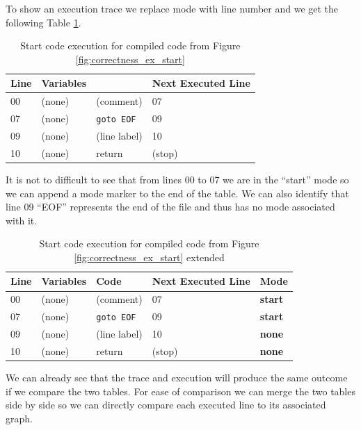 To show an execution trace we replace mode with line number and we get the following Table \ref{table:BasicExecOnly}.

\begin{table}[htcb]
	\caption{Start code execution for compiled code from Figure \ref{fig:correctness_ex_start}}
	\centering
		\begin{tabular}{| l | l | l | l |}
			\hline
			\textbf{Line} & \textbf{Variables} & \text{Code} & \textbf{Next Executed Line} \\
			\hline
			00 & (none) & (comment) & 07 \\
			\hline
			07 & (none) & \texttt{goto EOF} & 09 \\
			\hline
			09 & (none) & (line label) & 10 \\
			\hline
			10 & (none) & return & (stop) \\
			\hline
		\end{tabular}
	\label{table:BasicExecOnly}
\end{table}

It is not to difficult to see that from lines 00 to 07 we are in the ``start'' mode so we can append a
mode marker to the end of the table. We can also identify that line 09 ``EOF'' represents the end of the
file and thus has no mode associated with it.

\begin{table}[htcb]
	\caption{Start code execution for compiled code from Figure \ref{fig:correctness_ex_start} extended}
	\centering
		\begin{tabular}{| l | l | l | l | l |}
			\hline
			\textbf{Line} & \textbf{Variables} & \textbf{Code} & \textbf{Next Executed Line} & \textbf{Mode}\\
			\hline
			00 & (none) & (comment) & 07 & \textbf{start} \\
			\hline
			07 & (none) & \texttt{goto EOF} & 09 &  \textbf{start}\\
			\hline
			09 & (none) & (line label) & 10 & \textbf{none} \\
			\hline
			10 & (none) & return & (stop) & \textbf{none} \\
			\hline
		\end{tabular}
	\label{table:BasicExecMode}
\end{table}

We can already see that the trace and execution will produce the same outcome
if we compare the two tables. For ease of comparison we can
merge the two tables side by side so we can directly compare each executed 
line to its associated graph.

